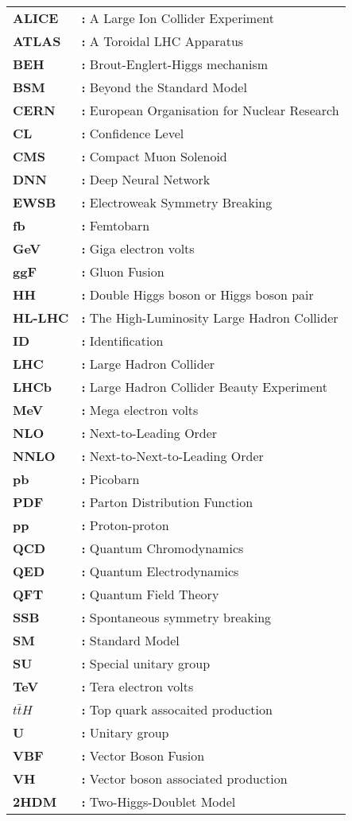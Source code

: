 \begin{tabular}{@{}p{2cm}l}
{\bf ALICE} & {\bf:} A Large Ion Collider Experiment\\
{\bf ATLAS} & {\bf:} A Toroidal LHC Apparatus\\
{\bf BEH} & {\bf:} Brout-Englert-Higgs mechanism\\
{\bf BSM} & {\bf:} Beyond the Standard Model\\
{\bf CERN} & {\bf:} European Organisation for Nuclear Research\\
{\bf CL} & {\bf:} Confidence Level\\
{\bf CMS} & {\bf:} Compact Muon Solenoid\\
{\bf DNN} & {\bf:} Deep Neural Network\\
{\bf EWSB} & {\bf:} Electroweak Symmetry Breaking\\
{\bf fb} & {\bf:} Femtobarn\\
{\bf GeV} & {\bf:} Giga electron volts\\
{\bf ggF} & {\bf:} Gluon Fusion\\
{\bf HH} & {\bf:} Double Higgs boson or Higgs boson pair\\
{\bf HL-LHC} & {\bf:} The High-Luminosity Large Hadron Collider\\
{\bf ID} & {\bf:} Identification\\
{\bf LHC} & {\bf:} Large Hadron Collider\\
{\bf LHCb} & {\bf:} Large Hadron Collider Beauty Experiment\\
{\bf MeV} & {\bf:} Mega electron volts\\
{\bf NLO} & {\bf:} Next-to-Leading Order\\
{\bf NNLO} & {\bf:} Next-to-Next-to-Leading Order\\
{\bf pb} & {\bf:} Picobarn\\
{\bf PDF} & {\bf:} Parton Distribution Function\\
{\bf pp} & {\bf:} Proton-proton\\
{\bf QCD} & {\bf:} Quantum Chromodynamics\\
{\bf QED} & {\bf:} Quantum Electrodynamics\\
{\bf QFT} & {\bf:} Quantum Field Theory\\
{\bf SSB} & {\bf:} Spontaneous symmetry breaking\\
{\bf SM} & {\bf:} Standard Model\\
{\bf SU} & {\bf:} Special unitary group\\
{\bf TeV} & {\bf:} Tera electron volts\\
{\bf $t\bar tH$} & {\bf:} Top quark assocaited production\\
{\bf U} & {\bf:} Unitary group\\
{\bf VBF} & {\bf:} Vector Boson Fusion\\
{\bf VH} & {\bf:} Vector boson associated production\\
{\bf 2HDM} & {\bf:} Two-Higgs-Doublet Model\\
\end{tabular}

